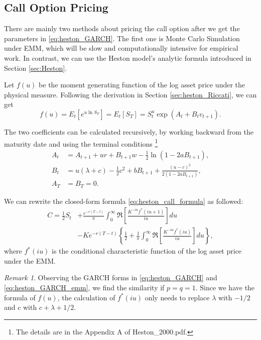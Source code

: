 \documentclass[a4paper,12pt]{article}
\numberwithin{equation}{section}
\theoremstyle{definition}
\theoremstyle{remark}
\newtheorem{remark}{Remark}[section]
\begin{document}
\subsection{Call Option Pricing}
There are mainly two methods about pricing the call option after 
we get the parameters in \eqref{eq:heston_GARCH}. The first one 
is Monte Carlo Simulation under EMM, which will be slow and 
computationally intensive for empirical work. In contrast, we can 
use the Heston model's analytic formula introduced in Section 
\ref{sec:Heston}.

Let $f(u)$ be the moment generating function of the log asset price 
under the physical measure. Following the derivation in Section 
\ref{sec:heston_Riccati}, we can get 
\begin{equation}
    f(u)=E_{t}[e^{u\ln S_{T}}]=E_{t}[S_{T}]
    =S_{t}^{u}\exp(A_{t}+B_{t}v_{t+1}).
\end{equation}

The two coefficients can be calculated recursively, by working 
backward from the maturity date and using the terminal conditions
\footnote{The details are in the Appendix A of Heston\_2000.pdf.}
\begin{equation}
    \begin{split}
        A_{t}&=A_{t+1}+ur+B_{t+1}w-\frac{1}{2}\ln (1-2aB_{t+1}), \\
        B_{t}&= u(\lambda+c)-\frac{1}{2}c^{2}+bB_{t+1}
        +\frac{(u-c)^{2}}{2(1-2aB_{t+1})}, \\
        A_{T}&=B_{T}=0.
    \end{split}
\end{equation}

We can rewrite the closed-form formula 
\eqref{eq:heston_call_formula} as followed:
\begin{equation}
\label{eq:heston_call_formula_simplified}
\begin{split}
    C=\frac{1}{2}S_{t}&+\frac{e^{-r(T-t)}}{\pi}
    \int_{0}^{\infty} \Re\left[\frac{K^{-iu}f^{*}(iu+1)}{iu}
    \right] du \\
    &-Ke^{-r(T-t)}\left\{\frac{1}{2}+\frac{1}{\pi}
    \int_{0}^{\infty} \Re\left[\frac{K^{-iu}f^{*}(iu)}{iu}
    \right] du\right\},
\end{split}
\end{equation}
where $f^{*}(iu)$ is the conditional characteristic function of 
the log asset price under the EMM.

\begin{remark}
Observing the GARCH forms in \eqref{eq:heston_GARCH} and 
\eqref{eq:heston_GARCH_emm}, we find the similarity if $p=q=1$. 
Since we have the formula of $f(u)$, the calculation of $f^{*}(iu)$ 
only needs to replace $\lambda$ with $-1/2$ and $c$ with 
$c+\lambda+1/2$.
\end{remark}
\end{document}
